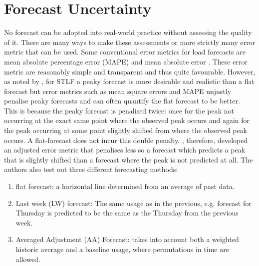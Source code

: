 %
%
%



\section{Forecast Uncertainty}

No forecast can be adopted into real-world practice without assessing the quality of it. There are many ways to make these assessments or more strictly many error metric that can be used. %
Some conventional error metrics for load forecasts are mean absolute percentage error (MAPE) and mean absolute error \citep{hong16}. These error metric are reasonably simple and transparent and thus quite favourable. However, as noted by \cite{dan14}, for STLF a peaky forecast is more desirable and realistic than a flat forecast but error metrics such as mean square errors and MAPE unjustly penalise peaky forecasts and can often quantify the flat forecast to be better. This is because the peaky forecast is penalised twice: once for the peak not occurring at the exact same point where the observed peak occurs and again for the peak occurring at some point slightly shifted from where the observed peak occurs. A flat-forecast does not incur this double penalty. \citet{dan14}, therefore, developed an adjusted error metric that penalises less so a forecast which predicts a peak that is slightly shifted than a forecast where the peak is not predicted at all. The authors also test out three different forecasting methods:
\begin{enumerate}
\item flat forecast: a horizontal line determined from an average of past data.
\item Last week (LW) forecast: The same usage as in the previous, e.g. forecast for Thursday is predicted to be the same as the Thursday from the previous week.
\item Averaged Adjustment (AA) Forecast: takes into account both a weighted historic average and a baseline usage, where permutations in time are allowed.
\end{enumerate}

